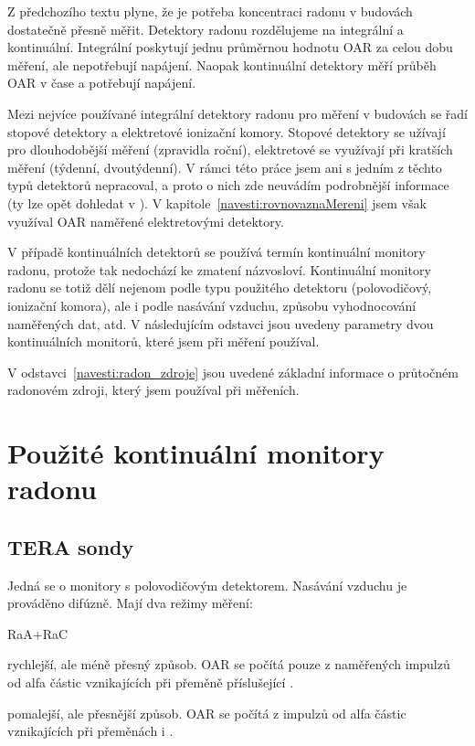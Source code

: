 Z předchozího textu plyne, že je potřeba koncentraci radonu v budovách dostatečně přesně měřit. Detektory radonu rozdělujeme na integrální a kontinuální. Integrální poskytují jednu průměrnou hodnotu OAR za celou dobu měření, ale nepotřebují napájení. Naopak kontinuální detektory měří průběh OAR v čase a potřebují napájení. 

Mezi nejvíce používané integrální detektory radonu pro měření v budovách se řadí stopové detektory a elektretové ionizační komory. Stopové detektory se užívají pro dlouhodobější měření (zpravidla roční), elektretové se využívají při kratších měření (týdenní, dvoutýdenní). V rámci této práce jsem ani s jedním z těchto typů detektorů nepracoval, a proto o nich zde neuvádím podrobnější informace (ty lze opět dohledat v \cite{SURO}). V kapitole~\ref{navesti:rovnovaznaMereni} jsem však využíval OAR naměřené elektretovými detektory.

V případě kontinuálních detektorů se používá termín kontinuální monitory radonu, protože tak nedochází ke zmatení názvosloví. Kontinuální monitory radonu se totiž dělí nejenom podle typu použitého detektoru (polovodičový, ionizační komora), ale i podle nasávání vzduchu, způsobu vyhodnocování naměřených dat, atd. V následujícím odstavci jsou uvedeny parametry dvou kontinuálních monitorů, které jsem při měření používal.

V odstavci~\ref{navesti:radon_zdroje} jsou uvedené základní informace o průtočném radonovém zdroji, který jsem používal při měřeních.

\section{Použité kontinuální monitory radonu}
\subsection{TERA sondy}
Jedná se o monitory s polovodičovým detektorem. Nasávání vzduchu je prováděno difúzně. Mají dva režimy měření:
\begin{labeling}{RaA+RaC}
    \item[RaA] rychlejší, ale méně přesný způsob. OAR se počítá pouze z naměřených impulzů od alfa částic vznikajících při přeměně příslušející .
    \item[RaA+RaC] pomalejší, ale přesnější způsob. OAR se počítá z impulzů od alfa částic vznikajících při přeměnách  i .
\end{labeling}

